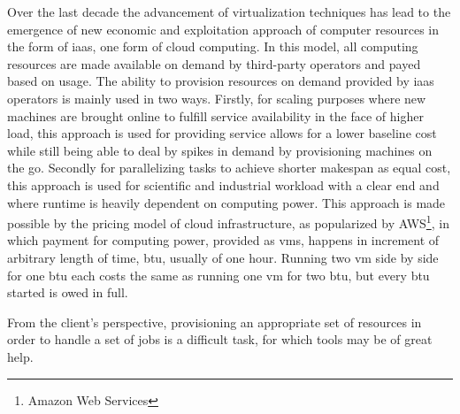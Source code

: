 \documentclass[10pt,conference,compsocconf]{IEEEtran}
\begin{document}
Over the  last decade the advancement  of virtualization techniques has  lead to
the emergence of new economic and exploitation approach of computer resources in
the form of \ac{iaas}, one form of cloud computing. In this model, all computing
resources are made available on demand  by third-party operators and payed based
on usage.   The ability to provision  resources on demand provided  by \ac{iaas}
operators is mainly  used in two ways.  Firstly, for  scaling purposes where new
machines  are brought  online to  fulfill service  availability in  the face  of
higher load,  this approach  is used  for providing service  allows for  a lower
baseline cost while still being able to deal by spikes in demand by provisioning
machines  on  the go.   Secondly  for  parallelizing  tasks to  achieve  shorter
makespan as  equal cost,  this approach  is used  for scientific  and industrial
workload with  a clear end and  where runtime is heavily  dependent on computing
power.   This  approach  is  made  possible   by  the  pricing  model  of  cloud
infrastructure, as  popularized by  AWS\footnote{Amazon Web Services},  in which
payment  for computing  power, provided  as  \acp{vm}, happens  in increment  of
arbitrary length  of time, \ac{btu},  usually of  one hour. Running  two \ac{vm}
side by side for one \ac{btu} each costs the same as running one \ac{vm} for two
\ac{btu}, but every \ac{btu} started is owed in full.

From the client's  perspective, provisioning an appropriate set  of resources in
order to  handle a set of  jobs is a difficult  task, for which tools  may be of
great help.   
\end{document}

